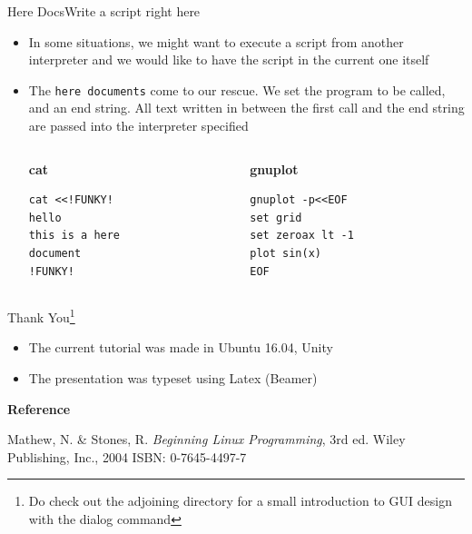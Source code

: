 \documentclass{beamer}
\begin{document}
\begin{frame}[fragile]{Here Docs}{Write a script right here}
  \begin{itemize}
  \item In some situations, we might want to execute a script from
    another interpreter and we would like to have the script in the
    current one itself
  \item The \verb|here documents| come to our rescue. We set the
    program to be called, and an end string. All text written in
    between the first call and the end string are passed into the
    interpreter specified\\
    \begin{columns}
      \begin{column}{0.35\textwidth}
        \textbf{cat}\\
\begin{verbatim}
cat <<!FUNKY!
hello
this is a here
document
!FUNKY!
\end{verbatim}
      \end{column}
      \begin{column}{0.35\textwidth}
        \textbf{gnuplot}\\
\begin{verbatim}
gnuplot -p<<EOF
set grid
set zeroax lt -1
plot sin(x)
EOF
\end{verbatim}
      \end{column}
    \end{columns}
  \end{itemize}
\end{frame}

\begin{frame}{Thank You\footnote{Do check out the adjoining directory
      for a small introduction to GUI design with the dialog command}}
  \begin{itemize}
  \item The current tutorial was made in Ubuntu 16.04, Unity
  \item The presentation was typeset using Latex (Beamer)    
  \end{itemize}

  \textbf{Reference}
  \begin{thebibliography}{2}
     Mathew, N. \& Stones, R. \emph{Beginning Linux
        Programming}, 3rd ed. Wiley Publishing, Inc., 2004 ISBN:
      0-7645-4497-7  
  \end{thebibliography}
\end{frame}
\end{document}
